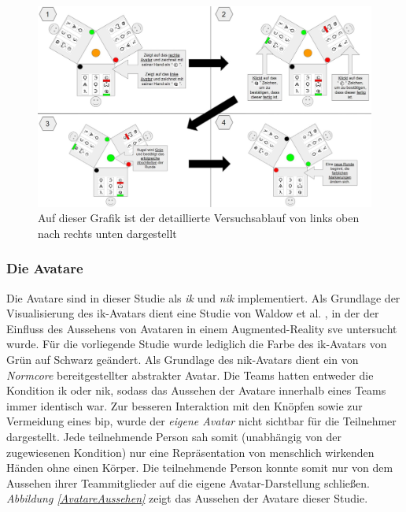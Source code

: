 \documentclass[a4paper,11pt]{article}%
\renewcommand{\\}{\vspace*{0.5\baselineskip} \newline}
\begin{document}
	\begin{figure}[h]
		\begin{footnotesize}
		\centering
			\includegraphics[scale=0.30]{Abbildungen/DetaillierterVersuchsablauf.JPG}		
			\caption[Darstellung des Versuchsablaufs]{Auf dieser Grafik ist der detaillierte Versuchsablauf von links oben nach rechts unten dargestellt}
			\label{DetaillierterVersuchsablauf}
		\end{footnotesize}
	\end{figure}

	\subsubsection{Die Avatare}
\label{IKNIK}
Die Avatare sind in dieser Studie als \textit{\ac{ik}} und \textit{\ac{nik}} implementiert. Als Grundlage der Visualisierung des \ac{ik}-Avatars dient eine Studie von Waldow et al. \citep{waldow2019investigating}, in der der Einfluss des Aussehens von Avataren in einem Augmented-Reality \ac{sve} untersucht wurde. Für die vorliegende Studie wurde lediglich die Farbe des \ac{ik}-Avatars von Grün auf Schwarz geändert. 
Als Grundlage des \ac{nik}-Avatars dient ein von \textit{Normcore} bereitgestellter abstrakter Avatar.
Die Teams hatten entweder die Kondition \glqq{}\ac{ik}\dq{} oder \glqq{}\ac{nik}\dq{}, sodass das Aussehen der Avatare innerhalb eines Teams immer identisch war. Zur besseren Interaktion mit den Knöpfen sowie zur Vermeidung eines \ac{bip}, wurde der \textit{eigene Avatar} nicht sichtbar für die Teilnehmer dargestellt. Jede teilnehmende Person sah somit (unabhängig von der zugewiesenen Kondition) nur eine Repräsentation von menschlich wirkenden Händen ohne einen Körper. Die teilnehmende Person konnte somit nur von dem Aussehen ihrer Teammitglieder auf die eigene Avatar-Darstellung schließen. \textit{Abbildung \ref{AvatareAussehen}} zeigt das Aussehen der Avatare dieser Studie.
\end{document}
